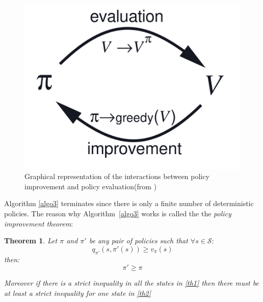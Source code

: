 \documentclass[14pt,a4paper]{article}
\newtheorem{theorem}{Theorem}
\theoremstyle{definition}
\begin{document}
\begin{figure}[ht]
\centering
\captionsetup{justification=centering,margin=2cm}

\includegraphics[scale=0.7]{img/policy_iter_sutton.PNG}
\caption{Graphical representation of the interactions between policy improvement and policy evaluation(from \citep{Sutton})}
\label{fig:Sutton}
\end{figure}






Algorithm \ref{algo3} terminates since there is only a finite number of deterministic policies.
The reason why  Algorithm~\ref{algo3} works is called the the \emph{policy improvement theorem}:

\begin{theorem}
Let $\pi$ and $\pi'$ be any pair of policies such that  $\forall s \in \mathcal{S}: $
\begin{equation}
q_{\pi'}(s,\pi'(s))\geq v_{\pi}(s) \label{th1}
\end{equation}
then:
\begin{equation}
\pi' \geq \pi \label{th2}
\end{equation}


Moreover if there is a strict inequality in all the states in \eqref{th1} then there must be at least a strict inequality for one state in \eqref{th2}
\end{theorem}
\end{document}
